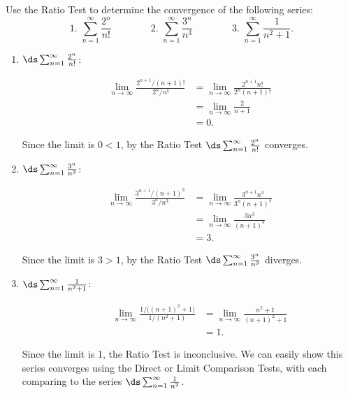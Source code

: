 
\begin{example}\label{ex_ratio1}
Use the Ratio Test to determine the convergence of the following series:
\[
 \text{1. }\sum_{n=1}^\infty \frac{2^n}{n!}\qquad\qquad
 \text{2. }\sum_{n=1}^\infty \frac{3^n}{n^3}\qquad\qquad
 \text{3. }\sum_{n=1}^\infty \frac{1}{n^2+1}.
\]
\solution
\begin{enumerate}
	\item $\ds \sum_{n=1}^\infty \frac{2^n}{n!}$:\\[-3\baselineskip]\parbox[t]{\linewidth}{%
	\begin{align*}
		\lim_{n\to\infty}\frac{2^{n+1}/(n+1)!}{2^n/n!}
		&= \lim_{n\to\infty} \frac{2^{n+1}n!}{2^n(n+1)!}\\
		&= \lim_{n\to\infty} \frac{2}{n+1}\\
		&=0.
	\end{align*}}
	Since the limit is $0<1$, by the Ratio Test $\ds\sum_{n=1}^\infty \frac{2^n}{n!}$ converges.
	
	\item	$\ds\sum_{n=1}^\infty \frac{3^n}{n^3}$:\\[-3\baselineskip]\parbox[t]{\linewidth}{%
	\begin{align*}
		\lim_{n\to\infty} \frac{3^{n+1}/(n+1)^3}{3^n/n^3}
		&= \lim_{n\to\infty}\frac{3^{n+1}n^3}{3^n(n+1)^3}\\
		&= \lim_{n\to\infty} \frac{3n^3}{(n+1)^3}\\
		&= 3.
	\end{align*}}
	Since the limit is $3>1$, by the Ratio Test $\ds\sum_{n=1}^\infty \frac{3^n}{n^3}$ diverges.
	
	\item  $\ds\sum_{n=1}^\infty \frac{1}{n^2+1}$:\\[-3\baselineskip]\parbox[t]{\linewidth}{%
	\begin{align*}
		\qquad\lim_{n\to\infty} \frac{1/\bigl((n+1)^2+1\bigr)}{1/(n^2+1)}
		&= \lim_{n\to\infty} \frac{n^2+1}{(n+1)^2+1}\\
		&= 1.
	\end{align*}}
	Since the limit is 1, the Ratio Test is inconclusive. We can easily show this series converges using the Direct or Limit Comparison Tests, with each comparing to the series $\ds \sum_{n=1}^\infty \frac{1}{n^2}$.
\end{enumerate}
\end{example}

